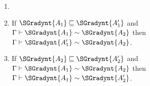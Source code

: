 \begin{lemma}
  \label{lemma:congruence_of_type_consistency_along_type_precision}
  \begin{enumerate}[label=\roman*.,align=left]
  \item[] 
  \item If $ \SGradynt{A_{{\mathrm{1}}}}  \sqsubseteq  \SGradynt{A'_{{\mathrm{1}}}} $ and $ \Gamma  \vdash  \SGradynt{A_{{\mathrm{1}}}}  \sim  \SGradynt{A_{{\mathrm{2}}}} $ then
    $ \Gamma  \vdash  \SGradynt{A'_{{\mathrm{1}}}}  \sim  \SGradynt{A_{{\mathrm{2}}}} $.
    
  \item If $ \SGradynt{A_{{\mathrm{2}}}}  \sqsubseteq  \SGradynt{A'_{{\mathrm{2}}}} $ and $ \Gamma  \vdash  \SGradynt{A_{{\mathrm{1}}}}  \sim  \SGradynt{A_{{\mathrm{2}}}} $ then
    $ \Gamma  \vdash  \SGradynt{A_{{\mathrm{1}}}}  \sim  \SGradynt{A'_{{\mathrm{2}}}} $.  
  \end{enumerate}
\end{lemma}
